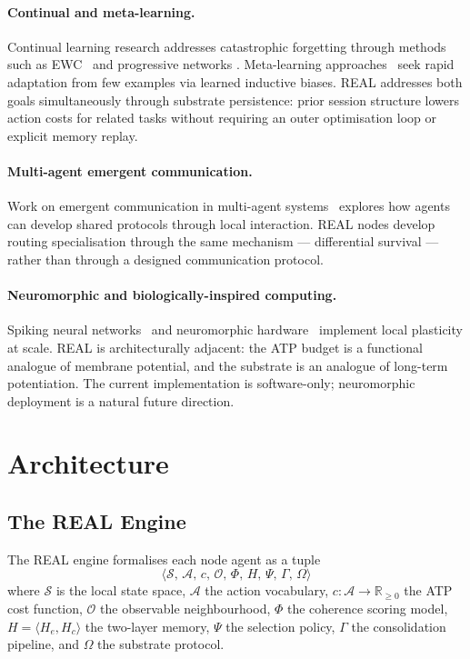 \documentclass[10pt,twocolumn]{article}
\newcommand{\He}{H_e}
\newcommand{\Hc}{H_c}
\begin{document}
\paragraph{Continual and meta-learning.}
Continual learning research addresses catastrophic forgetting through methods
such as EWC~\citep{kirkpatrick2017overcoming} and progressive networks
\citep{rusu2016progressive}.
Meta-learning approaches~\citep{finn2017model} seek rapid adaptation from few
examples via learned inductive biases.
REAL addresses both goals simultaneously through substrate persistence: prior
session structure lowers action costs for related tasks without requiring an
outer optimisation loop or explicit memory replay.

\paragraph{Multi-agent emergent communication.}
Work on emergent communication in multi-agent systems~\citep{lazaridou2020emergent}
explores how agents can develop shared protocols through local interaction.
REAL nodes develop routing specialisation through the same mechanism ---
differential survival --- rather than through a designed communication protocol.

\paragraph{Neuromorphic and biologically-inspired computing.}
Spiking neural networks~\citep{maass1997networks} and neuromorphic
hardware~\citep{davies2018loihi} implement local plasticity at scale.
REAL is architecturally adjacent: the ATP budget is a functional analogue of
membrane potential, and the substrate is an analogue of long-term potentiation.
The current implementation is software-only; neuromorphic deployment is a
natural future direction.

\section{Architecture}
\label{sec:architecture}

\subsection{The REAL Engine}

The REAL engine formalises each node agent as a tuple
\[
  \langle \mathcal{S},\, \mathcal{A},\, c,\, \mathcal{O},\,
          \Phi,\, H,\, \Psi,\, \Gamma,\, \Omega \rangle
\]
where $\mathcal{S}$ is the local state space, $\mathcal{A}$ the action
vocabulary, $c: \mathcal{A} \to \mathbb{R}_{\geq 0}$ the ATP cost function,
$\mathcal{O}$ the observable neighbourhood, $\Phi$ the coherence scoring model,
$H = \langle \He, \Hc \rangle$ the two-layer memory, $\Psi$ the selection
policy, $\Gamma$ the consolidation pipeline, and $\Omega$ the substrate protocol.
\end{document}
